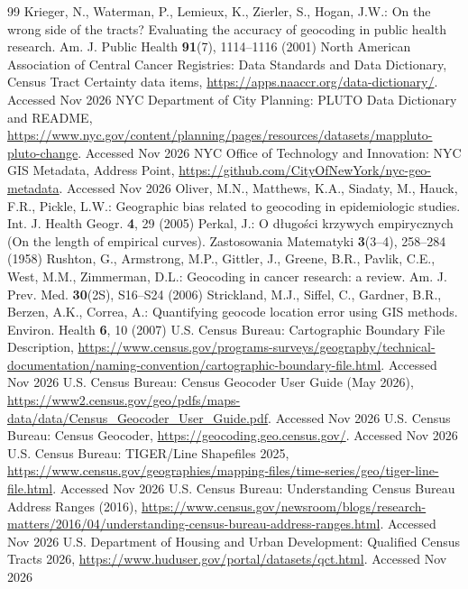 \documentclass[runningheads]{llncs}
\begin{document}
\begin{thebibliography}{99}
 Krieger, N., Waterman, P., Lemieux, K., Zierler, S., Hogan, J.W.: On the wrong side of the tracts? Evaluating the accuracy of geocoding in public health research. Am. J. Public Health \textbf{91}(7), 1114--1116 (2001)
 North American Association of Central Cancer Registries: Data Standards and Data Dictionary, Census Tract Certainty data items, \url{https://apps.naaccr.org/data-dictionary/}. Accessed Nov 2026
 NYC Department of City Planning: PLUTO Data Dictionary and README, \url{https://www.nyc.gov/content/planning/pages/resources/datasets/mappluto-pluto-change}. Accessed Nov 2026
 NYC Office of Technology and Innovation: NYC GIS Metadata, Address Point, \url{https://github.com/CityOfNewYork/nyc-geo-metadata}. Accessed Nov 2026
 Oliver, M.N., Matthews, K.A., Siadaty, M., Hauck, F.R., Pickle, L.W.: Geographic bias related to geocoding in epidemiologic studies. Int. J. Health Geogr. \textbf{4}, 29 (2005)
 Perkal, J.: O d{\l}ugo\'sci krzywych empirycznych (On the length of empirical curves). Zastosowania Matematyki \textbf{3}(3--4), 258--284 (1958)
 Rushton, G., Armstrong, M.P., Gittler, J., Greene, B.R., Pavlik, C.E., West, M.M., Zimmerman, D.L.: Geocoding in cancer research: a review. Am. J. Prev. Med. \textbf{30}(2S), S16--S24 (2006)
 Strickland, M.J., Siffel, C., Gardner, B.R., Berzen, A.K., Correa, A.: Quantifying geocode location error using GIS methods. Environ. Health \textbf{6}, 10 (2007)
 U.S. Census Bureau: Cartographic Boundary File Description, \url{https://www.census.gov/programs-surveys/geography/technical-documentation/naming-convention/cartographic-boundary-file.html}. Accessed Nov 2026
 U.S. Census Bureau: Census Geocoder User Guide (May 2026), \url{https://www2.census.gov/geo/pdfs/maps-data/data/Census_Geocoder_User_Guide.pdf}. Accessed Nov 2026
 U.S. Census Bureau: Census Geocoder, \url{https://geocoding.geo.census.gov/}. Accessed Nov 2026
 U.S. Census Bureau: TIGER/Line Shapefiles 2025, \url{https://www.census.gov/geographies/mapping-files/time-series/geo/tiger-line-file.html}. Accessed Nov 2026
 U.S. Census Bureau: Understanding Census Bureau Address Ranges (2016), \url{https://www.census.gov/newsroom/blogs/research-matters/2016/04/understanding-census-bureau-address-ranges.html}. Accessed Nov 2026
 U.S. Department of Housing and Urban Development: Qualified Census Tracts 2026, \url{https://www.huduser.gov/portal/datasets/qct.html}. Accessed Nov 2026

\end{thebibliography}
\end{document}
